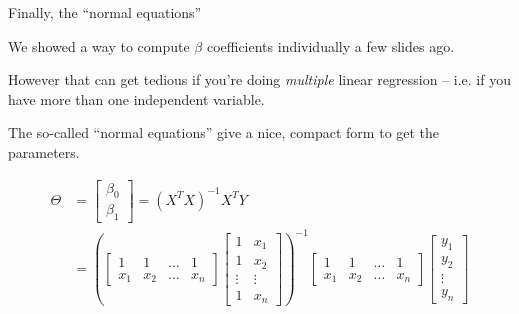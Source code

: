 \documentclass[aspectratio=169]{beamer}
\begin{document}
\begin{frame}{Finally, the ``normal equations''}

We showed a  way to compute $\beta$ coefficients individually a few slides ago.

\vspace{5mm}\pause

However that can get tedious if you're doing \textit{multiple} linear regression -- i.e. if you have more than one independent variable.  

\vspace{5mm}

The so-called ``normal equations'' give a nice, compact form to get the parameters.

\begin{align*}
\Theta &= 
\begin{bmatrix}
	\beta_0\\
	\beta_1
\end{bmatrix}
= 
(X^TX)^{-1}X^TY\\
&= 
\left(
\begin{bmatrix} 
  1 & 1&\ldots & 1\\
  x_1& x_2 &\ldots & x_n
\end{bmatrix} 
\begin{bmatrix} 
  1 & x_1\\
  1 & x_2\\
  \vdots & \vdots \\
  1 & x_n 
\end{bmatrix} \right)^{-1}
\begin{bmatrix} 
  1 & 1&\ldots & 1\\
  x_1& x_2 &\ldots & x_n
\end{bmatrix} 
\begin{bmatrix} 
  y_1\\
  y_2\\
   \vdots \\
  y_n 
\end{bmatrix} 
\end{align*}
\end{frame}
\end{document}
